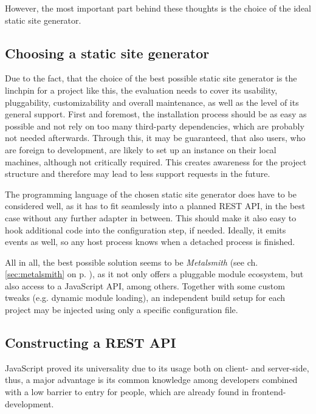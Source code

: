 However, the most important part behind these thoughts is the choice of the ideal static site generator.


\subsection{Choosing a static site generator}
\label{sec:primarythoughts-generator}

Due to the fact, that the choice of the best possible static site generator is the linchpin for a project like this, the evaluation needs to cover its usability, pluggability, customizability and overall maintenance, as well as the level of its general support. First and foremost, the installation process should be as easy as possible and not rely on too many third-party dependencies, which are probably not needed afterwards. Through this, it may be guaranteed, that also users, who are foreign to development, are likely to set up an instance on their local machines, although not critically required. This creates awareness for the project structure and therefore may lead to less support requests in the future.

The programming language of the chosen static site generator does have to be considered well, as it has to fit seamlessly into a planned REST API, in the best case without any further adapter in between. This should make it also easy to hook additional code into the configuration step, if needed. Ideally, it emits events as well, so any host process knows when a detached process is finished.

All in all, the best possible solution seems to be \emph{Metalsmith} (see ch. \ref{sec:metalsmith} on p. \pageref{sec:metalsmith}), as it not only offers a pluggable module ecosystem, but also access to a JavaScript API, among others. Together with some custom tweaks (e.g. dynamic module loading), an independent build setup for each project may be injected using only a specific configuration file.


\subsection{Constructing a REST API}
\label{sec:primarythoughts-restapi}

JavaScript proved its universality due to its usage both on client- and server-side, thus, a major advantage is its common knowledge among developers combined with a low barrier to entry for people, which are already found in frontend-development.

